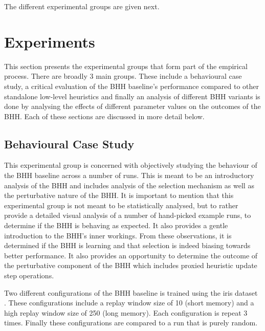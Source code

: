 The different experimental groups are given next.







\section{Experiments}
\label{sec:methodology:experiments}

This section presents the experimental groups that form part of the empirical process. There are broadly 3 main groups. These include a behavioural case study, a critical evaluation of the \ac{BHH} baseline's performance compared to other standalone low-level heuristics and finally an analysis of different \ac{BHH} variants is done by analysing the effects of different parameter values on the outcomes of the \ac{BHH}. Each of these sections are discussed in more detail below.


\subsection{Behavioural Case Study}
\label{sec:methodology:experiments:case_study}

This experimental group is concerned with objectively studying the behaviour of the \ac{BHH} baseline across a number of runs. This is meant to be an introductory analysis of the \ac{BHH} and includes analysis of the selection mechanism as well as the perturbative nature of the \ac{BHH}. It is important to mention that this experimental group is not meant to be statistically analysed, but to rather provide a detailed visual analysis of a number of hand-picked example runs, to determine if the \ac{BHH} is behaving as expected. It also provides a gentle introduction to the \ac{BHH}'s inner workings. From these observations, it is determined if the \ac{BHH} is learning and that selection is indeed biasing towards better performance. It also provides an opportunity to determine the outcome of the perturbative component of the \ac{BHH} which includes proxied heuristic update step operations.

Two different configurations of the \ac{BHH} baseline is trained using the iris dataset \cite{ref:fisher:1936}. These configurations include a replay window size of 10 (short memory) and a high replay window size of 250 (long memory). Each configuration is repeat 3 times. Finally these configurations are compared to a run that is purely random.

